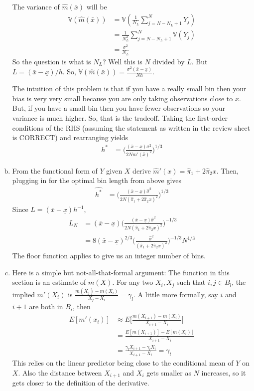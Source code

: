 \documentclass{article}[12pt]
\begin{document}
\begin{enumerate}[(a)]
	The variance of $\hat{m}(\bar{x})$ will be
	\begin{align*}
		\mathbb{V}(\hat{m}(\bar{x})) &= \mathbb{V}(\frac{1}{N_L} \sum_{j=N - N_L + 1}^{N} Y_j ) \\
		&= \frac{1}{N_L^2} \sum_{j=N - N_L + 1}^{N} \mathbb{V} (Y_j) \\
		&= \frac{\sigma^2}{N_L}
	\end{align*}
	So the question is what is $N_L$? Well this is $N$ divided by $L$. But $L = (\bar{x} - \underline{x}) / h$. So, $\mathbb{V}(\hat{m}(\bar{x})) = \frac{\sigma^2 (\bar{x} - \underline{x})}{Nh}$.

	The intuition of this problem is that if you have a really small bin then your bias is very very small because you are only taking observations close to $\bar{x}$. But, if you have a small bin then you have fewer observations so your variance is much higher. So, that is the tradeoff. Taking the first-order conditions of the RHS (assuming the statement as written in the review sheet is CORRECT) and rearranging yields
	\begin{align*}
		h^* &= \Big( \frac{(\bar{x} - \underline{x})\sigma^2}{2 N m'(\bar{x})^2} \Big)^{1/3}
	\end{align*}
	\item From the functional form of $Y$ given $X$ derive $\hat{m}'(x) = \hat{\pi}_1 + 2 \hat{\pi}_2 x$. Then, plugging in for the optimal bin length from above gives
	\begin{align*}
		\hat{h^*} &= \Big( \frac{(\bar{x} - \underline{x}) \hat{\sigma}^2}{2 N (\hat{\pi}_1 + 2 \hat{\pi}_2 x)^2} \Big)^{1/3}
	\end{align*}
	Since $L = (\bar{x} - \underline{x}) h^{-1}$,
	\begin{align*}
		L_N &= (\bar{x} - \underline{x}) \Big( \frac{(\bar{x} - \underline{x})\hat{\sigma}^2}{2 N (\hat{\pi}_1 + 2 \hat{\pi}_2 x)^2} \Big)^{-1/3} \\
		&= 8(\bar{x} - \underline{x})^{2/3} \Big( \frac{\hat{\sigma}^2}{(\hat{\pi}_1 + 2 \hat{\pi}_2 x)^2} \Big)^{-1/3} N^{1/3}
	\end{align*}
	The floor function applies to give us an integer number of bins.

	\item Here is a simple but not-all-that-formal argument: The function in this section is an estimate of $m(X)$. For any two $X_i, X_j$ such that $i, j \in B_l$, the implied $m'(X_i)$ is $\frac{m(X_j) - m(X_i)}{X_j - X_i} = \gamma_l$. A little more formally, say $i$ and $i+1$ are both in $B_i$, then
	\begin{align*}
	 	E[m'(x_i)] &\approx E\Big[ \frac{m(X_{i+1})-m(X_i)}{X_{i+1} - X_i} \Big] \\
	 	&= \frac{ E[m(X_{i+1})]- E[m(X_i)]}{X_{i+1} - X_i} \\
	 	&= \frac{ \gamma_l X_{i+1} - \gamma_l X_i}{X_{i+1} - X_i} = \gamma_l
	\end{align*}
	This relies on the linear predictor being close to the conditional mean of $Y$ on $X$. Also the distance between $X_{i+1}$ and $X_i$ gets smaller as $N$ increases, so it gets closer to the definition of the derivative.
	
\end{enumerate}
\end{document}
